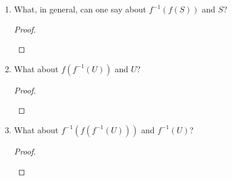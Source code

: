 \documentclass[../../main.tex]{subfiles}
\begin{document}
\begin{enumerate}
    \item
        \begin{q}
            What, in general, can one say about $f^{-1}(f(S))$ and $S$?
        \end{q}
        
        \begin{ans}
            
        \end{ans}
            
        \begin{proof}
            
            \begin{xx}
                
            \end{xx}
        \end{proof}
    \item
        \begin{q}
            What about $f(f^{-1}(U))$ and $U$?
        \end{q}
        
        \begin{ans}
            
        \end{ans}
            
        \begin{proof}
            
            \begin{xx}
                
            \end{xx}
        \end{proof}
    \item 
        \begin{q}
            What about $f^{-1}(f(f^{-1}(U)))$ and $f^{-1}(U)$? 
        \end{q}
        
        \begin{ans}
            
        \end{ans}
            
        \begin{proof}
            
            \begin{xx}
                
            \end{xx}
        \end{proof}
\end{enumerate}
\end{document}
